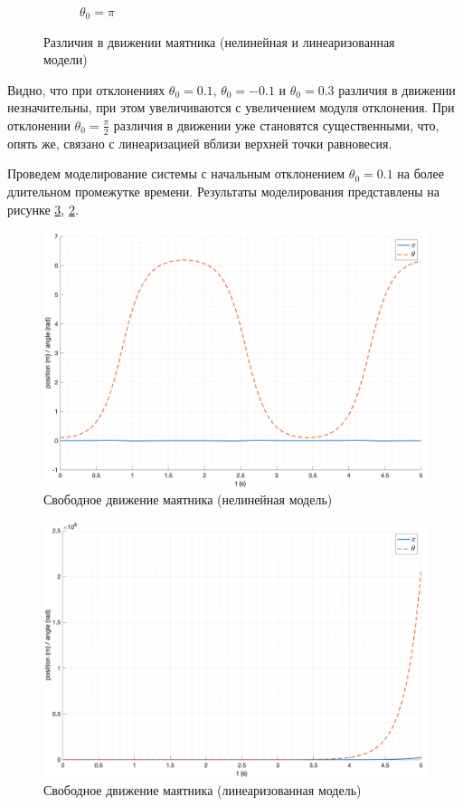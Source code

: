 \begin{figure}[ht!]
\begin{subfigure}[b]{0.45\textwidth}
        \caption{$\theta_0 = \pi$}
    \end{subfigure}
    \caption{Различия в движении маятника (нелинейная и линеаризованная модели)}
    \label{fig:free_motion_err}
\end{figure}

Видно, что при отклонениях $\theta_0 = 0.1$, $\theta_0 = -0.1$ и $\theta_0 = 0.3$ 
различия в движении незначительны, при этом увеличиваются с увеличением 
модуля отклонения. При отклонении $\theta_0 = \frac{\pi}{2}$ различия в движении
уже становятся существенными, что, опять же, связано с линеаризацией вблизи 
верхней точки равновесия. 

Проведем моделирование системы с начальным отклонением $\theta_0 = 0.1$ на более длительном 
промежутке времени. Результаты моделирования представлены на рисунке \ref{fig:free_motion_long_linear}, 
\ref{fig:free_motion_long_nonlinear}. 
\begin{figure}[ht!]
    \centering
    \includegraphics[width=\textwidth]{media/plots/free_motion/long.png}
    \caption{Свободное движение маятника (нелинейная модель)}
    \label{fig:free_motion_long_nonlinear}
\end{figure}
\begin{figure}[ht!]
    \centering
    \includegraphics[width=\textwidth]{media/plots/free_motion/long_linear.png}
    \caption{Свободное движение маятника (линеаризованная модель)}
    \label{fig:free_motion_long_linear}
\end{figure}

